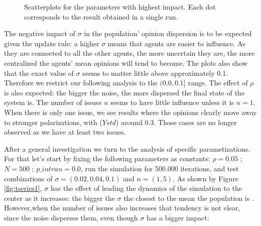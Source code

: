 \documentclass{article}
\begin{document}
\begin{figure}[H]
\begin{subfigure}[b]{0.5\textwidth}
     \end{subfigure}
     \caption{Scatterplots for the parameters with highest impact. Each dot corresponds to the result obtained in a single run.}
      \label{fig:scatters}
    \end{figure}



    The negative impact of \(\sigma\) in the population' opinion dispersion is
    to be expected given the update rule: a higher \(\sigma\) means that agents
    are easier to influence. As they are connected to all the other agents, the more
    uncertain they are, the more centralized the agents' mean opinions will tend to become. 
    The plots also show that the exact value of \(\sigma\) seems to matter little above approximately
    0.1. Therefore we restrict our following analysis to the \((0.0, 0.1 ] \)
    range. The effect of \(\rho\) is also expected: the bigger the noise, the more
    dispersed the final state of the system is. The number of issues $n$ seems to have little
    influence unless it is $n=1$. When there is only one issue, we see results where the opinions
    clearly move away to stronger polarizations, with (\(Ystd\)) around 0.3. Those cases are no
    longer observed as we have at least two issues.

    
    After a general investigation we turn to the analysis of specific
    parametizations. For that let's start by fixing the following parameters as
    constants: \(\rho = 0.05 \) ; \(N = 500\) ; \(p\_intran = 0.0\), run the
    simulation for 500.000 iterations, and test combinations of $\sigma = (0.02,
    0.04, 0.1)$ and $ n = (1,5)$. As shown by Figure \ref{fig:tseries1},
    \(\sigma\) has the effect of leading the dynamics of the simulation to the
    center as it increases: the bigger the \(\sigma\) the closest to the mean
    the population is . However,when the number of issues also increases that
    tendency is not clear, since the noise disperses them, even though
    \(\sigma\) has a bigger impact:
\end{document}
